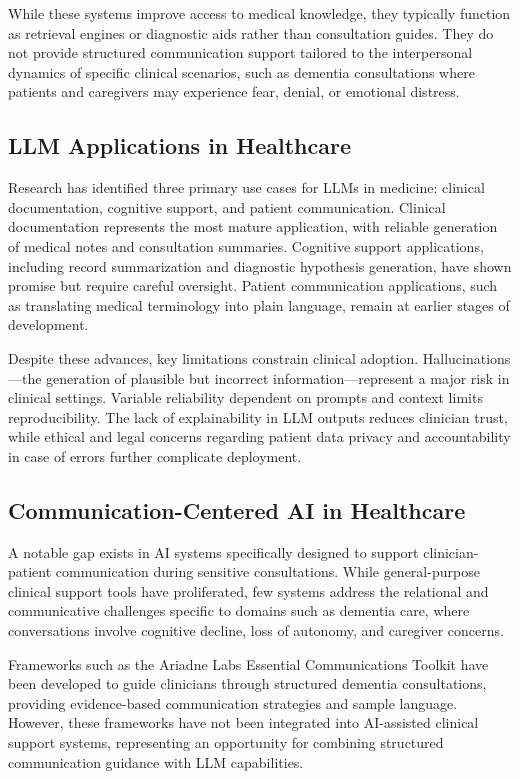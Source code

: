While these systems improve access to medical knowledge, they typically function as retrieval engines or diagnostic aids rather than consultation guides. They do not provide structured communication support tailored to the interpersonal dynamics of specific clinical scenarios, such as dementia consultations where patients and caregivers may experience fear, denial, or emotional distress.

\subsection{LLM Applications in Healthcare}

Research has identified three primary use cases for LLMs in medicine: clinical documentation, cognitive support, and patient communication. Clinical documentation represents the most mature application, with reliable generation of medical notes and consultation summaries. Cognitive support applications, including record summarization and diagnostic hypothesis generation, have shown promise but require careful oversight. Patient communication applications, such as translating medical terminology into plain language, remain at earlier stages of development.

Despite these advances, key limitations constrain clinical adoption. Hallucinations---the generation of plausible but incorrect information---represent a major risk in clinical settings. Variable reliability dependent on prompts and context limits reproducibility. The lack of explainability in LLM outputs reduces clinician trust, while ethical and legal concerns regarding patient data privacy and accountability in case of errors further complicate deployment.

\subsection{Communication-Centered AI in Healthcare}

A notable gap exists in AI systems specifically designed to support clinician-patient communication during sensitive consultations. While general-purpose clinical support tools have proliferated, few systems address the relational and communicative challenges specific to domains such as dementia care, where conversations involve cognitive decline, loss of autonomy, and caregiver concerns.

Frameworks such as the Ariadne Labs Essential Communications Toolkit have been developed to guide clinicians through structured dementia consultations, providing evidence-based communication strategies and sample language. However, these frameworks have not been integrated into AI-assisted clinical support systems, representing an opportunity for combining structured communication guidance with LLM capabilities.

